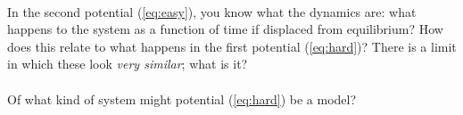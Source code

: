 \documentclass[12pt]{article}
\newcounter{problem}
\begin{document}
\paragraph{\theproblem}%
In the second potential (\ref{eq:easy}), you know what the dynamics
are: what happens to the system as a function of time if displaced
from equilibrium?  How does this relate to what happens in the first
potential (\ref{eq:hard})?  There is a limit in which these look
\emph{very similar}; what is it?

\paragraph{\theproblem}%
Of what kind of system might potential (\ref{eq:hard}) be a model?
\end{document}
